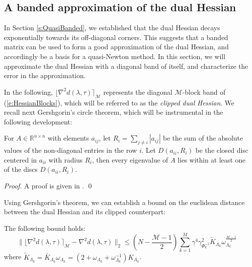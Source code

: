 \subsection{A banded approximation of the dual Hessian}

In Section \ref{s:QuasiBanded}, we established that the dual Hessian decays exponentially towards its off-diagonal corners. This suggests that a banded matrix can be used to form a good approximation of the dual Hessian, and accordingly be a basis for a quasi-Newton method. In this section, we will approximate the dual Hessian with a diagonal band of itself, and characterize the error in the approximation.

In the following, $\lfloor \nabla^2 d(\lambda, \tau) \rceil_{\mathcal{M}}$ represents the diagonal $\mathcal{M}$-block band of (\ref{e:HessianBlocks}), which will be referred to as the \emph{clipped dual Hessian}. We recall next Gershgorin's circle theorem, which will be instrumental in the following development:
\begin{theorem} \label{l:Gerschgorin}
For $A \in \mathbb{R}^{n \times n}$ with elements $a_{ij}$, let $R_i = \sum_{j \neq i} | a_{ij} |$ be the sum of the absolute values of the non-diagonal entries in the row $i$. Let $D(a_{ii},R_i)$ be the closed disc centered in $a_{ii}$ with radius $R_i$, then every eigenvalue of $A$ lies within at least one of the discs $D(a_{ii}, R_i)$.
\end{theorem}
\begin{proof}
A proof is given in \cite{HornR2013}.
\qed
\end{proof}
Using Gershgorin's theorem, we can establish a bound on the euclidean distance between the dual Hessian and its clipped counterpart:
\begin{lemma} \label{l:EuclidianDistance}
The following bound holds:
\begin{equation} \label{e:EuclidianDistance}
\| \lfloor \nabla^2 d(\lambda, \tau) \rceil_{\mathcal{M}} - \nabla^2 d(\lambda, \tau) \|_2 \leq \left( N -\frac{\mathcal{M} - 1}{2} \right) \sum_{k=1}^M \gamma^4 \gamma_{\Phi_k^{-1}}^2 \tilde{K}_{\Lambda_k} \omega_{\Lambda_k}^{\frac{\mathcal{M} - 1}{2}}
\end{equation}
where $\tilde{K}_{\Lambda_k} = \bar{K}_{\Lambda_k} \omega_{\Lambda_k} =  (2 + \omega_{\Lambda_k} + \omega_{\Lambda_k}^{-1}) K_{\Lambda_k}$.
\end{lemma}
